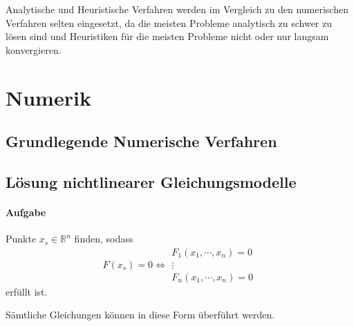         Analytische und Heuristische Verfahren werden im Vergleich zu den numerischen Verfahren selten eingesetzt, da die meisten Probleme analytisch zu schwer zu lösen sind und Heuristiken für die meisten Probleme nicht oder nur langsam konvergieren.

    \section{Numerik} %
	    \subsection{Grundlegende Numerische Verfahren}
		    
    
        \subsection{Lösung nichtlinearer Gleichungsmodelle} %
            \paragraph{Aufgabe}
                Punkte \( x _ s \in \mathbb{R} ^ n \) finden, sodass
                \begin{equation*}
	                F(x _ s) = 0 \iff
	                \begin{matrix}
		                F _ 1 (x _ 1, \cdots, x _ n) = 0 \\
		                \vdots \\
		                F _ n (x _ 1, \cdots, x _ n) = 0
	                \end{matrix}
                \end{equation*}
                erfüllt ist.
                
                Sämtliche Gleichungen können in diese Form überführt werden.

